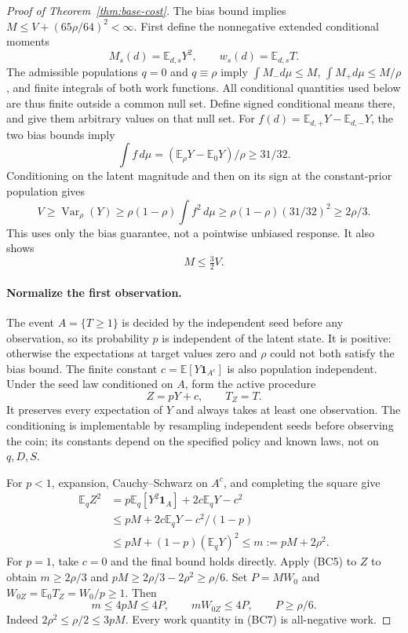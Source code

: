 \begin{proof}[Proof of Theorem~\ref{thm:base-cost}]
The bias bound implies $M\le V+(65\rho/64)^2<\infty$.
First define the nonnegative extended conditional moments
\[
 M_s(d)=\mathbb E_{d,s}Y^2,\qquad w_s(d)=\mathbb E_{d,s}T.
\]
The admissible populations $q=0$ and $q\equiv\rho$ imply
$\int M_-d\mu\le M$, $\int M_+d\mu\le M/\rho$, and finite
integrals of both work functions. All conditional quantities used below
are thus finite outside a common null set. Define signed conditional
means there, and give them arbitrary values on that null set. For
$f(d)=\mathbb E_{d,+}Y-\mathbb E_{d,-}Y$, the two bias bounds imply
\[
 \int f\,d\mu=(\mathbb E_\rho Y-\mathbb E_0Y)/\rho\ge31/32.
\]
Conditioning on the latent magnitude and then on its sign at the
constant-prior population gives
\[
 V\ge\operatorname{Var}_\rho(Y)
 \ge\rho(1-\rho)\int f^2\,d\mu
 \ge\rho(1-\rho)(31/32)^2\ge2\rho/3.                   \tag{BC5}
\]
This uses only the bias guarantee, not a pointwise unbiased response.
It also shows
\[
                        M\le\tfrac32 V.               \tag{BC6}
\]

\paragraph{Normalize the first observation.}
The event $A=\{T\ge1\}$ is decided by the independent seed before any
observation, so its probability $p$ is independent of the latent state.
It is positive: otherwise the expectations at target values zero and
$\rho$ could not both satisfy the bias bound. The finite constant
$c=\mathbb E[Y\mathbf1_{A^c}]$ is also population independent. Under
the seed law conditioned on $A$, form the active procedure
\[
                  Z=pY+c,\qquad T_Z=T.
\]
It preserves every expectation of $Y$ and always takes at least one
observation. The conditioning is implementable by resampling independent
seeds before observing the coin; its constants depend on the specified
policy and known laws, not on $q,D,S$.

For $p<1$, expansion, Cauchy--Schwarz on $A^c$, and completing the square
give
\begin{align*}
 \mathbb E_qZ^2
 &=p\mathbb E_q[Y^2\mathbf1_A]+2c\mathbb E_qY-c^2\\
 &\le pM+2c\mathbb E_qY-c^2/(1-p)\\
 &\le pM+(1-p)(\mathbb E_qY)^2
 \le m:=pM+2\rho^2.
\end{align*}
For $p=1$, take $c=0$ and the final bound holds directly. Apply (BC5) to
$Z$ to obtain $m\ge2\rho/3$ and
$pM\ge2\rho/3-2\rho^2\ge\rho/6$. Set
$P=MW_0$ and $W_{0Z}=\mathbb E_0T_Z=W_0/p\ge1$. Then
\[
 m\le4pM\le4P,\qquad mW_{0Z}\le4P,
 \qquad P\ge\rho/6.                                   \tag{BC7}
\]
Indeed $2\rho^2\le\rho/2\le3pM$. Every work quantity in (BC7) is
all-negative work.


\end{proof}
